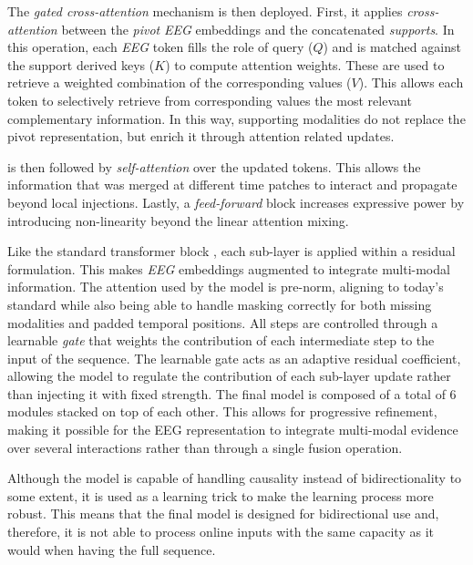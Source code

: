 The \textit{gated cross-attention} mechanism is then deployed.
First, it applies \textit{cross-attention} between the \textit{pivot} \textit{EEG} embeddings and the concatenated \textit{supports}.
In this operation, each \textit{EEG} token fills the role of query ($Q$) and is matched against the support derived keys ($K$) to compute attention weights.
These are used to retrieve a weighted combination of the corresponding values ($V$).
This allows each  token to selectively retrieve from corresponding values the most relevant complementary information.
In this way, supporting modalities do not replace the pivot representation, but enrich it through attention related updates.

 is then followed by \textit{self-attention} over the updated tokens.
This allows the information that was merged at different time patches to interact and propagate beyond local injections.
Lastly, a \textit{feed-forward} block increases expressive power by introducing non-linearity beyond the linear attention mixing.

Like the standard transformer block \cite{}, each sub-layer is applied within a residual formulation.
This makes \textit{EEG} embeddings  augmented to integrate multi-modal information.
The attention used by the model is pre-norm, aligning to today's standard while also being able to handle masking correctly for both missing modalities and padded temporal positions.
All steps are controlled through a learnable \textit{gate} that weights the contribution of each intermediate step to the input of the sequence.
The learnable gate acts as an adaptive residual coefficient, allowing the model to regulate the contribution of each sub-layer update rather than injecting it with fixed strength.
The final model is composed of a total of 6  modules stacked on top of each other.
This allows for progressive refinement, making it possible for the EEG representation to integrate multi-modal evidence over several interactions rather than through a single fusion operation.

Although the model is capable of handling causality instead of bidirectionality to some extent, it is used as a learning trick to make the learning process more robust.
This means that the final model is designed for bidirectional use and, therefore, it is not able to process online inputs with the same capacity as it would when having the full sequence.



